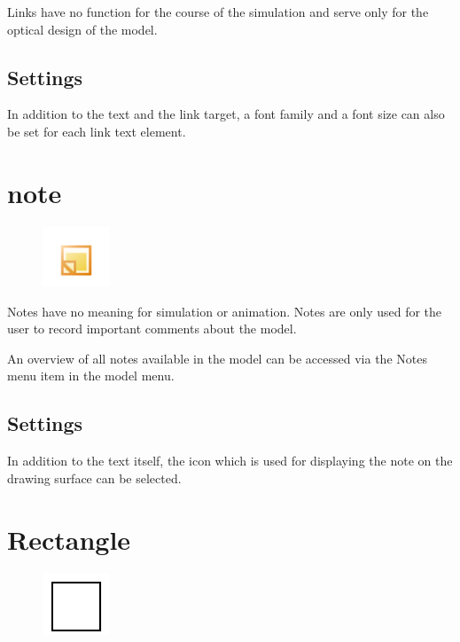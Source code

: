 Links have no function for the course of the simulation
and serve only for the optical design of the model.

\subsection*{Settings}

In addition to the text and the link target, a font family and a font size can also be set for each link text element.


\section{note}
\label{ref:ModelElementNote}

\begin{figure}
\vspace{-22pt}
\includegraphics[width=2cm]{imageModelElementNote.png}
\vspace{-22pt}
\end{figure}

Notes have no meaning for simulation or animation.
Notes are only used for the user to record important comments about the model.

An overview of all notes available in the model can be accessed via
the Notes menu item in the model menu.

\subsection*{Settings}

In addition to the text itself, the icon which is used for displaying
the note on the drawing surface can be selected.


\section{Rectangle}
\label{ref:ModelElementRectangle}

\begin{figure}
\vspace{-22pt}
\includegraphics[width=2cm]{imageModelElementRectangle.png}
\vspace{-22pt}
\end{figure}

